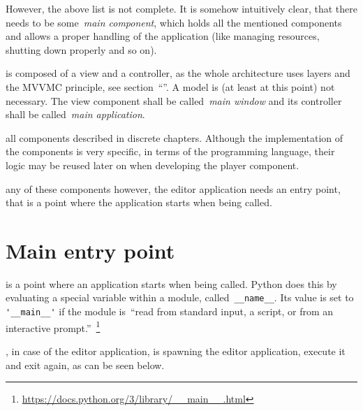 \documentclass[%
    a4paper,    %
    justified,  %
    nobib,      %
    openany     %
]{tufte-book}
\begin{document}
However, the above list is not complete. It is somehow intuitively clear, that
there needs to be some~\emph{main component}, which holds all the mentioned
components and allows a proper handling of the application (like managing
resources, shutting down properly and so on).

 is composed of a view and a controller, as the
whole architecture uses layers and the MVVMC principle, see
section~\enquote{}. A model is (at least at this point) not
necessary. The view component shall be called~\emph{main window} and its
controller shall be called~\emph{main application}.

 all components described in discrete chapters.
Although the implementation of the components is very specific, in terms of the
programming language, their logic may be reused later on when developing the
player component.

 any of these components however, the editor
application needs an entry point, that is a point where the application starts
when being called.

\section{Main entry point}
\label{appendix:sec:editor:main}

 is a point where an application starts when being
called. Python does this by evaluating a special variable within a module,
called~\verb+__name__+. Its value is set to \verb+'__main__'+ if the module
is~\enquote{read from standard input, a script, or from an interactive
prompt.}~\footnote{\url{https://docs.python.org/3/library/__main__.html}}

, in case of the editor
application, is spawning the editor application, execute it and exit again, as
can be seen below.
\end{document}
